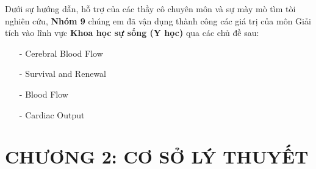 \documentclass[12pt,a4paper]{article}
\begin{document}
\vspace{2em}
Dưới sự hướng dẫn, hỗ trợ của các thầy cô chuyên môn và sự mày mò tìm tòi nghiên cứu, \textbf{Nhóm 9} chúng em đã vận dụng thành công 
các giá trị của môn Giải tích vào lĩnh vực \textbf{Khoa học sự sống (Y học)} qua các chủ đề sau:
\begin{itemize}
	\item[-] Cerebral Blood Flow
	\item[-] Survival and Renewal
	\item[-] Blood Flow
	\item[-] Cardiac Output
\end{itemize}

\newpage
{}
\section*{CHƯƠNG 2: CƠ SỞ LÝ THUYẾT}
\setcounter{section}{2}
\end{document}
